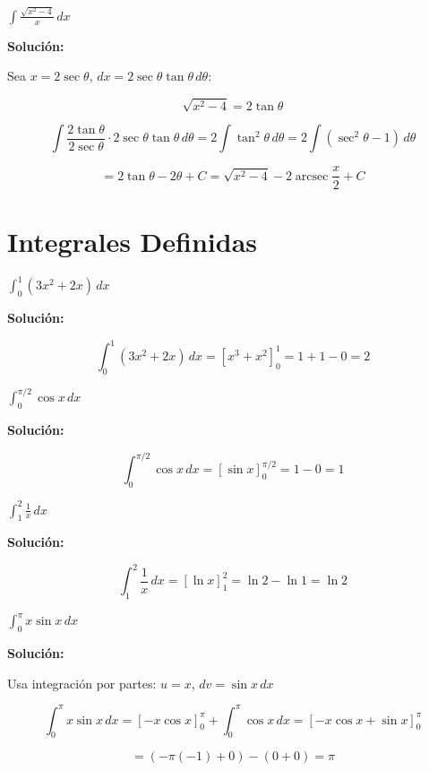 \documentclass[12pt, a4paper]{book}
\begin{document}
\begin{ejercicio}
$\int \frac{\sqrt{x^2-4}}{x} \, dx$
\end{ejercicio}

\textbf{Solución:}

Sea $x = 2\sec\theta$, $dx = 2\sec\theta\tan\theta \, d\theta$:

\[
\sqrt{x^2-4} = 2\tan\theta
\]

\[
\int \frac{2\tan\theta}{2\sec\theta} \cdot 2\sec\theta\tan\theta \, d\theta = 2\int \tan^2\theta \, d\theta = 2\int (\sec^2\theta - 1) \, d\theta
\]

\[
= 2\tan\theta - 2\theta + C = \sqrt{x^2-4} - 2\operatorname{arcsec}\frac{x}{2} + C
\]

\section{Integrales Definidas}

\begin{ejercicio}
$\int_0^1 (3x^2 + 2x) \, dx$
\end{ejercicio}

\textbf{Solución:}

\[
\int_0^1 (3x^2 + 2x) \, dx = [x^3 + x^2]_0^1 = 1 + 1 - 0 = 2
\]

\begin{ejercicio}
$\int_0^{\pi/2} \cos x \, dx$
\end{ejercicio}

\textbf{Solución:}

\[
\int_0^{\pi/2} \cos x \, dx = [\sin x]_0^{\pi/2} = 1 - 0 = 1
\]

\begin{ejercicio}
$\int_1^2 \frac{1}{x} \, dx$
\end{ejercicio}

\textbf{Solución:}

\[
\int_1^2 \frac{1}{x} \, dx = [\ln x]_1^2 = \ln 2 - \ln 1 = \ln 2
\]

\begin{ejercicio}
$\int_0^{\pi} x\sin x \, dx$
\end{ejercicio}

\textbf{Solución:}

Usa integración por partes: $u = x$, $dv = \sin x \, dx$

\[
\int_0^{\pi} x\sin x \, dx = [-x\cos x]_0^{\pi} + \int_0^{\pi} \cos x \, dx = [-x\cos x + \sin x]_0^{\pi}
\]

\[
= (-\pi(-1) + 0) - (0 + 0) = \pi
\]
\end{document}
